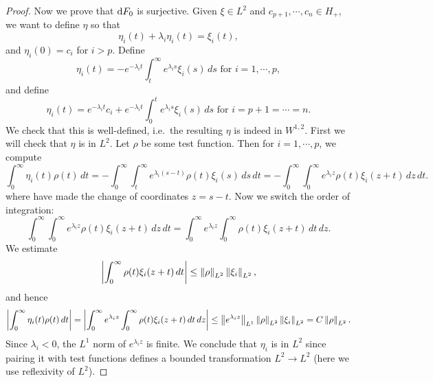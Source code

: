 \begin{proof}
  Now we prove that $\mathrm{d} F_{0}$ is surjective. Given $\xi\in L^{2}$ and $c_{p+1},\cdots,c_{n}\in H_{+}$, we want to define $\eta$ so that
  \begin{equation*}
    \eta_{i}(t)+\lambda_{i}\eta_{i}(t)=\xi_{i}(t),
  \end{equation*}
  and $\eta_{i}(0)=c_{i}$ for $i>p$. Define
  \begin{equation*}
    \eta_{i}(t)=-e^{-\lambda_{i}t}\int_{t}^{\infty}e^{\lambda_{i}s}\xi_{i}(s)\,ds\text{ for $i=1,\cdots,p$},
  \end{equation*}
  and define
  \begin{equation*}
    \eta_{i}(t)=e^{-\lambda_{i}t}c_{i}+e^{-\lambda_{i}t}\int_{0}^{t}e^{\lambda_{i}s}\xi_{i}(s)\,ds\text{ for $i=p+1=\cdots=n$.}
  \end{equation*}
  We check that this is well-defined, i.e.\ the resulting $\eta$ is indeed in $W^{1,2}$. First we will check that $\eta$ is in $L^{2}$. Let $\rho$ be some test function. Then for $i=1,\cdots,p$, we compute
  \begin{equation*}
    \int_{0}^{\infty}\eta_{i}(t)\rho(t)\,dt=-\int_{0}^{\infty}\int_{t}^{\infty}e^{\lambda_{i}(s-t)}\rho(t)\xi_{i}(s)\,ds\,dt=-\int_{0}^{\infty}\int_{0}^{\infty}e^{\lambda_{i}z}\rho(t)\xi_{i}(z+t)\,dz\,dt.
  \end{equation*}
  where have made the change of coordinates $z=s-t$. Now we switch the order of integration:
  \begin{equation*}    \int_{0}^{\infty}\int_{0}^{\infty}e^{\lambda_{i}z}\rho(t)\xi_{i}(z+t)\,dz\,dt=\int_{0}^{\infty}e^{\lambda_{i}z}\int_{0}^{\infty}\rho(t)\xi_{i}(z+t)\,dt\,dz.
  \end{equation*}
  We estimate
  \begin{equation*}
    \left|\int_{0}^{\infty}\rho(t)\xi_{i}(z+t)\,dt\right|\le \left\lVert\rho\right\rVert_{L^{2}}\left\lVert\xi_{i}\right\rVert_{L^{2}},
  \end{equation*}
  and hence
  \begin{equation*}
    \left|\int_{0}^{\infty}\eta_{i}(t)\rho(t)\,dt\right|= \left|\int_{0}^{\infty}e^{\lambda_{i}z}\int_{0}^{\infty}\rho(t)\xi_{i}(z+t)\,dt\,dz\right|\le \left\lVert e^{\lambda_{i}z}\right\rVert_{L^{1}}\left\lVert\rho\right\rVert_{L^{2}}\left\lVert\xi_{i}\right\rVert_{L^{2}}=C\left\lVert\rho\right\rVert_{L^{2}}.
  \end{equation*}
  Since $\lambda_{i}<0$, the $L^{1}$ norm of $e^{\lambda_{i}z}$ is finite. We conclude that $\eta_{i}$ is in $L^{2}$ since pairing it with test functions defines a bounded transformation $L^{2}\to L^{2}$ (here we use reflexivity of $L^{2}$).


\end{proof}
